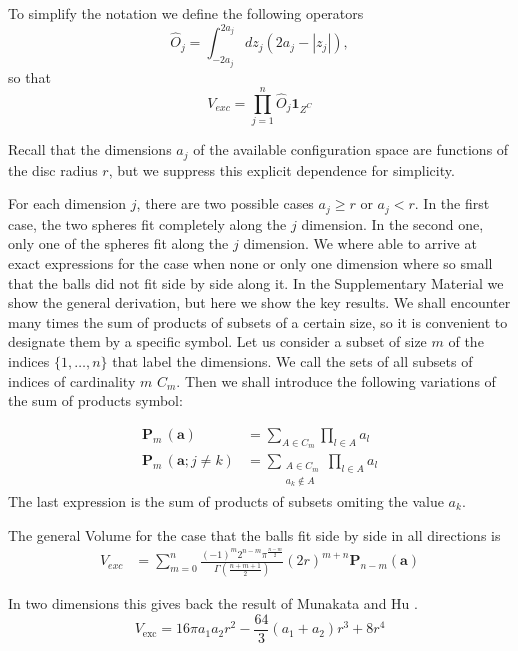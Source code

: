 \documentclass[superscriptaddress,pre,reprint,showpacs,twocolumn]{revtex4-1}
\newcommand{\sumprod}[1]{\mathbf{P}_{#1} \,}
\begin{document}
To simplify the notation we define the following operators
\begin{equation}
\hat{O}_j  = \int_{-2 a_j}^{2 a_j} dz_j \left( 2a_j -|z_j| \right), 
\end{equation}
so that
\begin{equation}\label{voloper}
V_{exc} = \prod_{j=1}^n \hat{O}_j \mathbf{1}_{Z^C}
\end{equation}

Recall that the dimensions $a_j$ of the available configuration space are functions of the disc radius $r$, 
but we suppress this explicit dependence for simplicity.

For each dimension $j$, there are two possible cases $a_j \geq r$ or $a_j < r$. In the first case, the two spheres fit completely along the $j$ dimension. In the second one, only one of the spheres fit along the $j$ dimension. We where able to arrive at
exact expressions for the case when none or only one dimension where so small that
the balls did not fit side by side along it. In the Supplementary Material we
show the general derivation, but here we show the key results.
We shall encounter many times the sum of products of subsets of a certain size,
so it is convenient to designate them by a specific symbol.
Let us consider a subset of size $m$ of the indices $\{1,\ldots, n\}$
 that label the dimensions. We call the sets of all subsets of indices of
 cardinality $m$ $C_m$. Then we shall introduce the following variations
 of the sum of products symbol:

 \begin{equation}
   \begin{aligned}
   \sumprod{m}(\mathbf{a}) & = \sum_{A \in C _m } \prod_{ l \in A } a_l \\
   \sumprod{m} (\mathbf{a}; j\neq k) & =
   \sum_{\substack{A \in  C _m \\ a_k \notin A} } \prod_{ l \in A } a_l
   \end{aligned}
 \end{equation}
The last expression is the sum of products of subsets omiting the
value $a_k$. 

The general Volume for the case that the balls fit side by side in all directions is
\begin{align}
V_{exc}  & =  \sum_{m=0}^{n}
 \frac{ (-1)^{m} 2^{n-m} \pi^\frac{n-m}{2}}{\Gamma \left( \frac{n+m + 1}{2}\right)} \left(2r\right)^{m+n}
 \mathbf{P}_{n-m}(\mathbf{a})
\end{align}

In two dimensions this gives back the result of Munakata and Hu \cite{Munakata02}.
\begin{equation}
V_\text{exc} = 16 \pi a_1 a_2 r^{2} - \textstyle \frac{64}{3} (a_1+a_2) r^{3}  + 8 r^{4}
\end{equation}
\end{document}
